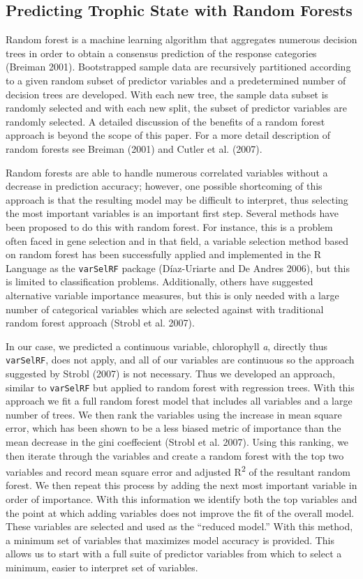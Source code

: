 \documentclass[12pt,]{article}
\begin{document}
\subsection{Predicting Trophic State with Random
Forests}\label{predicting-trophic-state-with-random-forests}

Random forest is a machine learning algorithm that aggregates numerous
decision trees in order to obtain a consensus prediction of the response
categories (Breiman 2001). Bootstrapped sample data are recursively
partitioned according to a given random subset of predictor variables
and a predetermined number of decision trees are developed. With each
new tree, the sample data subset is randomly selected and with each new
split, the subset of predictor variables are randomly selected. A
detailed discussion of the benefits of a random forest approach is
beyond the scope of this paper. For a more detail description of random
forests see Breiman (2001) and Cutler et al. (2007).

Random forests are able to handle numerous correlated variables without
a decrease in prediction accuracy; however, one possible shortcoming of
this approach is that the resulting model may be difficult to interpret,
thus selecting the most important variables is an important first step.
Several methods have been proposed to do this with random forest. For
instance, this is a problem often faced in gene selection and in that
field, a variable selection method based on random forest has been
successfully applied and implemented in the R Language as the
\texttt{varSelRF} package (D{í}az-Uriarte and De Andres 2006), but this
is limited to classification problems. Additionally, others have
suggested alternative variable importance measures, but this is only
needed with a large number of categorical variables which are selected
against with traditional random forest approach (Strobl et al. 2007).

In our case, we predicted a continuous variable, chlorophyll \emph{a},
directly thus \texttt{varSelRF}, does not apply, and all of our
variables are continuous so the approach suggested by Strobl (2007) is
not necessary. Thus we developed an approach, similar to
\texttt{varSelRF} but applied to random forest with regression trees.
With this approach we fit a full random forest model that includes all
variables and a large number of trees. We then rank the variables using
the increase in mean square error, which has been shown to be a less
biased metric of importance than the mean decrease in the gini
coeffecient (Strobl et al. 2007). Using this ranking, we then iterate
through the variables and create a random forest with the top two
variables and record mean square error and adjusted R\textsuperscript{2}
of the resultant random forest. We then repeat this process by adding
the next most important variable in order of importance. With this
information we identify both the top variables and the point at which
adding variables does not improve the fit of the overall model. These
variables are selected and used as the ``reduced model.'' With this
method, a minimum set of variables that maximizes model accuracy is
provided. This allows us to start with a full suite of predictor
variables from which to select a minimum, easier to interpret set of
variables.
\end{document}

